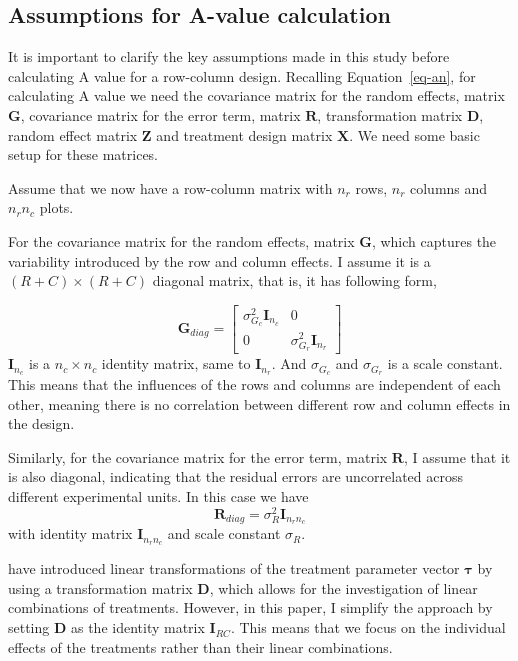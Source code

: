 \documentclass[
  a4paper,
  oneside,
  openany,
  12pt,
  onecolumn]{book}
\theoremstyle{plain}
\theoremstyle{definition}
\theoremstyle{remark}
\begin{document}
\subsection{Assumptions for A-value
calculation}\label{assumptions-for-a-value-calculation}

It is important to clarify the key assumptions made in this study before
calculating A value for a row-column design. Recalling
Equation~\ref{eq-an}, for calculating A value we need the covariance
matrix for the random effects, matrix \(\boldsymbol{G}\), covariance
matrix for the error term, matrix \(\boldsymbol{R}\), transformation
matrix \(\boldsymbol{D}\), random effect matrix \(\boldsymbol{Z}\) and
treatment design matrix \(\boldsymbol{X}\). We need some basic setup for
these matrices.

Assume that we now have a row-column matrix with \(n_r\) rows, \(n_r\)
columns and \(n_rn_c\) plots.

For the covariance matrix for the random effects, matrix
\(\boldsymbol{G}\), which captures the variability introduced by the row
and column effects. I assume it is a \((R+C)\times(R+C)\) diagonal
matrix, that is, it has following form,

\[
\boldsymbol{G}_{diag} =
\begin{bmatrix}
\sigma_{G_c}^2\boldsymbol{I}_{n_c} & 0 \\
0 & \sigma_{G_r}^2\boldsymbol{I}_{n_r}
\end{bmatrix}
\] \(\boldsymbol{I}_{n_c}\) is a \({n_c}\times{n_c}\) identity matrix,
same to \(\boldsymbol{I}_{n_r}\). And \(\sigma_{G_c}\) and
\(\sigma_{G_r}\) is a scale constant. This means that the influences of
the rows and columns are independent of each other, meaning there is no
correlation between different row and column effects in the design.

Similarly, for the covariance matrix for the error term, matrix
\(\boldsymbol{R}\), I assume that it is also diagonal, indicating that
the residual errors are uncorrelated across different experimental
units. In this case we have \[
\boldsymbol{R}_{diag} = \sigma_{R}^2\boldsymbol{I}_{n_rn_c}
\] with identity matrix \(\boldsymbol{I}_{n_rn_c}\) and scale constant
\(\sigma_{R}\).

\citet{butler2013optimal} have introduced linear transformations of the
treatment parameter vector \(\boldsymbol{\tau}\) by using a
transformation matrix \(\boldsymbol{D}\), which allows for the
investigation of linear combinations of treatments. However, in this
paper, I simplify the approach by setting \(\boldsymbol{D}\) as the
identity matrix \(\boldsymbol{I}_{RC}\). This means that we focus on the
individual effects of the treatments rather than their linear
combinations.
\end{document}
